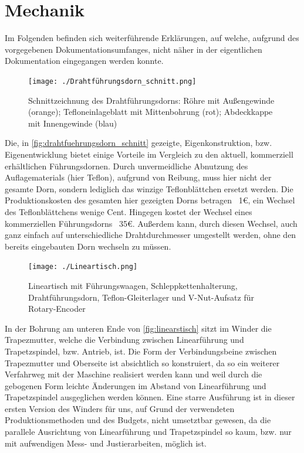 \appendix

\section{Mechanik}
\label{appx:mechanik}

Im Folgenden befinden sich weiterführende Erklärungen, auf welche, aufgrund des vorgegebenen Dokumentationsumfanges, nicht näher in der eigentlichen Dokumentation eingegangen werden konnte. 

\begin{figure}[H]
    \centering
    \texttt{[image: ./Drahtführungsdorn\_schnitt.png]}
    \caption{Schnittzeichnung des Drahtführungsdorns: Röhre mit Außengewinde (orange); Tefloneinlageblatt mit Mittenbohrung (rot); Abdeckkappe mit Innengewinde (blau)}
    \label{fig:drahtfuehrungsdorn_schnitt}
\end{figure}

Die, in \autoref{fig:drahtfuehrungsdorn_schnitt} gezeigte, Eigenkonstruktion, bzw. Eigenentwicklung bietet einige Vorteile im Vergleich zu den aktuell, kommerziell erhältlichen Führungsdornen. Durch unvermeidliche Abnutzung des Auflagematerials (hier Teflon), aufgrund von Reibung, muss hier nicht der gesamte Dorn, sondern lediglich das winzige Teflonblättchen ersetzt werden. Die Produktionskosten des gesamten hier gezeigten Dorns betragen ~1€, ein Wechsel des Teflonblättchens wenige Cent. Hingegen kostet der Wechsel eines kommerziellen Führungsdorns ~35€. Außerdem kann, durch diesen Wechsel, auch ganz einfach auf unterschiedliche Drahtdurchmesser umgestellt werden, ohne den bereits eingebauten Dorn wechseln zu müssen.


\begin{figure}[H]
    \centering
    \texttt{[image: ./Lineartisch.png]}
    \caption{Lineartisch mit Führungswaagen, Schleppkettenhalterung, Drahtführungsdorn, Teflon-Gleiterlager und V-Nut-Aufsatz für Rotary-Encoder}
    \label{fig:linearstisch}
\end{figure}
In der Bohrung am unteren Ende von \autoref{fig:linearstisch} sitzt im Winder die Trapezmutter, welche die Verbindung zwischen Linearführung und Trapetzspindel, bzw. Antrieb, ist. Die Form der Verbindungsbeine zwischen Trapezmutter und Oberseite ist absichtlich so konstruiert, da so ein weiterer Verfahrweg mit der Maschine realisiert werden kann und weil durch die gebogenen Form leichte Änderungen im Abstand von Linearführung und Trapetzspindel ausgeglichen werden können. Eine starre Ausführung ist in dieser ersten Version des Winders für uns, auf Grund der verwendeten Produktionsmethoden und des Budgets, nicht umsetztbar gewesen, da die parallele Ausrichtung von Linearführung und Trapetzspindel so kaum, bzw. nur mit aufwendigen Mess- und Justierarbeiten, möglich ist.

